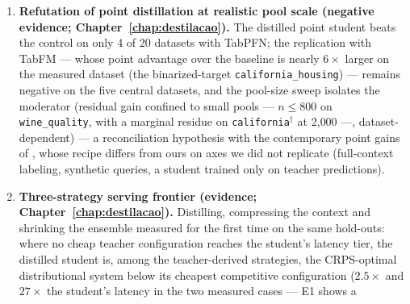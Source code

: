 \begin{enumerate}
\begin{enumerate}
    and coverage --- was verified as having no prior
    \emph{academic} work in this study's dated searches, July to
    November 2026 (complete record in
    Appendix~\ref{app:suplementares}; a public repository of
    September 2026 --- referenced in
    Section~\ref{sec:rel-destilacao} --- distills TabFM into
    XGBoost for classification and \emph{point} regression, without
    touching the distributional framing --- the non-tabular lineage
    of distributional distillation is cited as a precedent in
    Section~\ref{sec:rel-destilacao}). The evidence: median
    retention of 12\% to 19\% of the CRPS gap, depending on how the
    arms are tuned, positive on 16 of 20 datasets ($p=0.006$ single-stage,
    $p\approx0.019$ under the sequential correction; Bayesian
    posterior probability of 0.96 that the positive region is the
    most probable one, with expected posterior mass on it of 0.70), including a \emph{born-again}
    student (which matches its own teacher to within $10^{-4}$ of
    CRPS), serving at about a hundred microseconds per row.
  \item \textbf{Refutation of point distillation at realistic pool
    scale (negative evidence; Chapter~\ref{chap:destilacao}).} The
    distilled point student beats the control on only 4 of 20
    datasets with TabPFN; the replication with TabFM --- whose
    point advantage over the baseline is nearly $6\times$ larger on
    the measured dataset (the binarized-target
    \texttt{california\_housing}) --- remains negative on the five
    central datasets, and the pool-size sweep isolates the
    moderator (residual gain confined to small pools --- $n \leq
    800$ on \texttt{wine\_quality}, with a marginal residue on
    \texttt{california}$^\dagger$ at 2{,}000 ---,
    dataset-dependent) --- a reconciliation hypothesis with the
    contemporary point gains of \citet{jeong2026}, whose recipe
    differs from ours on axes we did not replicate (full-context
    labeling, synthetic queries, a student trained only on teacher
    predictions).
  \item \textbf{Three-strategy serving frontier (evidence;
    Chapter~\ref{chap:destilacao}).} Distilling, compressing the
    context and shrinking the ensemble measured for the first time
    on the same hold-outs: where no cheap teacher configuration
    reaches the student's latency tier, the distilled student is,
    among the teacher-derived strategies,
    the CRPS-optimal distributional system below its cheapest
    competitive configuration ($2.5\times$ and $27\times$ the
    student's latency in the two measured cases --- E1 shows a

\end{enumerate}
\end{enumerate}
